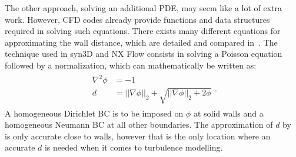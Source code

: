 The other approach, solving an additional PDE, may seem like a lot of extra work. However, CFD codes already provide functions and data structures required in solving such equations. There exists many different equations for approximating the wall distance, which are detailed and compared in~\cite{tucker2005computations,tucker2011hybrid,belyaev2015variational}. The technique used in syn3D and NX Flow consists in solving a Poisson equation followed by a normalization, which can mathematically be written as:
\begin{align}
    \begin{split}
    \nabla^2\phi &= -1\\
    d &= ||\nabla\phi||_2 + \sqrt{
        ||\nabla\phi||_2 + 2\phi
    }
    \end{split}
    \label{eq:poissondist}.
\end{align}
A homogeneous Dirichlet BC is to be imposed on $\phi$ at solid walls and a homogeneous Neumann BC at all other boundaries. The approximation of $d$ by~ is only accurate close to walls, however that is the only location where an accurate $d$ is needed when it comes to turbulence modelling.